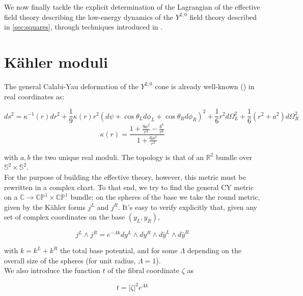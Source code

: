 \label{chap:y20}We now finally tackle the explicit determination of the Lagrangian of the effective field theory describing the low-energy dynamics of the $Y^{2,0}$ field theory described in \ref{sec:squares}, through techniques introduced in \cite{MZ}.

\section{K\"ahler moduli}

The general Calabi-Yau deformation of the $Y^{2,0}$ cone is already well-known () in real coordinates as:

\begin{equation}
ds^2 = \kappa^{-1}(r)dr^2 + \frac{1}{9} \kappa(r) r^2 (d\psi + \cos\theta_L d\phi_L + \cos\theta_R d\phi_R)^2 + \frac{1}{6} r^2 d\Omega_L^2 + \frac{1}{6}(r^2+a^2) d\Omega_R^2 \label{y20metric} \end{equation}
\begin{equation}
	\kappa(r) = \frac{1 + \frac{9a^2}{r^2} - \frac{b^6}{r^6}}{1+ \frac{6a^2}{r^2}}
\end{equation}

with $a,b$ the two unique real moduli. The topology is that of an $\mathbb{R}^2$ bundle over $\mathbb{S}^2 \times \mathbb{S}^2$.\\

For the purpose of building the effective theory, however, this metric must be rewritten in a complex chart. To that end, we try to find the general CY metric on a $\mathbb{C} \rightarrow \mathbb{CP}^1 \times \mathbb{CP}^1$ bundle; on the spheres of the base we take the round metric, given by the K\"ahler forms $j^L$ and $j^R$. It's easy to verify explicitly that, given any set of complex coordinates on the base $(y_L,y_R)$,

\begin{equation}
	j^L \wedge j^R = e^{-\Lambda k} dy^L \wedge dy^R \wedge d\bar y^L \wedge d\bar y^R
\end{equation}

with $k = k^L + k^R$ the total base potential, and for some $\Lambda$ depending on the overall size of the spheres (for unit radius, $\Lambda = 1$).\\

We also introduce the function $t$ of the fibral coordinate $\zeta$ as 

\begin{equation}
	t = |\zeta|^2 e^{\Lambda k}
\end{equation}

